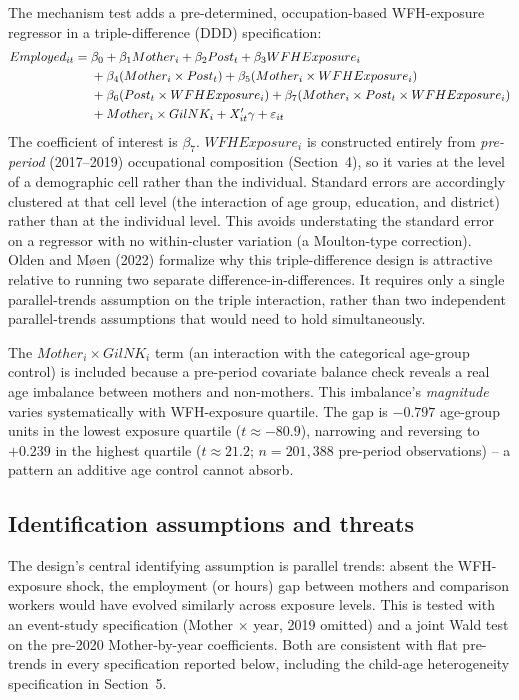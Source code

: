 \documentclass[11pt]{article}
\begin{document}
The mechanism test adds a pre-determined, occupation-based WFH-exposure regressor in a triple-difference (DDD) specification:
\begin{align}
Employed_{it} = {}& \beta_0 + \beta_1 Mother_i + \beta_2 Post_t + \beta_3 WFHExposure_i \notag \\
& + \beta_4 (Mother_i\times Post_t) + \beta_5(Mother_i \times WFHExposure_i) \notag \\
& + \beta_6(Post_t\times WFHExposure_i) + \beta_7 (Mother_i \times Post_t \times WFHExposure_i) \notag \\
& + Mother_i\times GilNK_i + X_{it}'\gamma + \varepsilon_{it}
\label{eq:ddd}
\end{align}
The coefficient of interest is $\beta_7$. $WFHExposure_i$ is constructed entirely from \emph{pre-period} (2017--2019) occupational composition (Section~4), so it varies at the level of a demographic cell rather than the individual. Standard errors are accordingly clustered at that cell level (the interaction of age group, education, and district) rather than at the individual level. This avoids understating the standard error on a regressor with no within-cluster variation (a Moulton-type correction). Olden and Møen (2022) formalize why this triple-difference design is attractive relative to running two separate difference-in-differences. It requires only a single parallel-trends assumption on the triple interaction, rather than two independent parallel-trends assumptions that would need to hold simultaneously.

The $Mother_i \times GilNK_i$ term (an interaction with the categorical age-group control) is included because a pre-period covariate balance check reveals a real age imbalance between mothers and non-mothers. This imbalance's \emph{magnitude} varies systematically with WFH-exposure quartile. The gap is $-0.797$ age-group units in the lowest exposure quartile ($t\approx-80.9$), narrowing and reversing to $+0.239$ in the highest quartile ($t\approx21.2$; $n=201{,}388$ pre-period observations) -- a pattern an additive age control cannot absorb.

\subsection{Identification assumptions and threats}

The design's central identifying assumption is parallel trends: absent the WFH-exposure shock, the employment (or hours) gap between mothers and comparison workers would have evolved similarly across exposure levels. This is tested with an event-study specification (Mother $\times$ year, 2019 omitted) and a joint Wald test on the pre-2020 Mother-by-year coefficients. Both are consistent with flat pre-trends in every specification reported below, including the child-age heterogeneity specification in Section~5.
\end{document}
